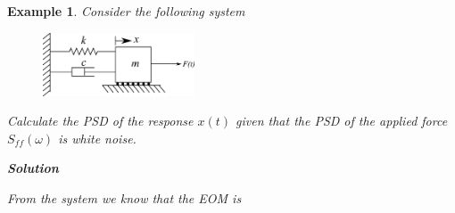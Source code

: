 \documentclass[12pt,letter]{article}
\newtheorem{ex}{Example}
\numberwithin{ex}{section} %
\newenvironment{example}{\begin{mdframed}[middlelinewidth=0.5mm]\begin{ex}\normalfont}{\end{ex}\end{mdframed}}
\begin{document}
\begin{example}

Consider the following system

\begin{figure}[H]
	\centering
	\includegraphics[width=0.4\textwidth]{../Figures/forced_spring_mass_damper_system.png}
\end{figure}

Calculate the PSD of the response $x(t)$ given that the PSD of the applied force $S_{ff}(\omega)$ is white noise. 

\textbf{Solution}

From the system we know that the EOM is 


\end{example}
\end{document}
